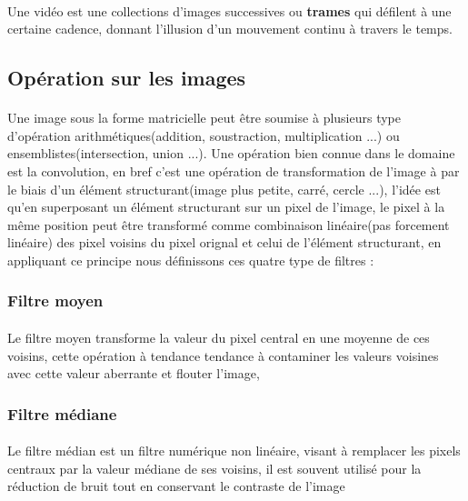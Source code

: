 \documentclass[12pt]{report}
\begin{document}
		\paragraph{}
		Une vidéo est une collections d'images successives ou \textbf{trames} qui défilent à
		une certaine cadence, donnant l'illusion d'un mouvement continu à travers le temps.
		
		\subsection{Opération sur les images}
		\paragraph{}
		Une image sous la forme matricielle peut être soumise à plusieurs type d'opération arithmétiques(addition,
		soustraction, multiplication ...) ou ensemblistes(intersection, union ...). Une opération bien
		connue dans le domaine est la convolution, en bref c'est une opération de transformation de l'image
		à par le biais d'un élément structurant(image plus petite, carré, cercle ...), l'idée est qu'en 
		superposant un élément structurant sur un pixel de l'image, le pixel à la même position peut être 
		transformé comme combinaison linéaire(pas forcement linéaire) des pixel voisins du pixel orignal et
		celui de l'élément structurant, en appliquant ce principe nous définissons ces quatre type de filtres :
		
			\subsubsection{Filtre moyen}
			\paragraph{}
			Le filtre moyen transforme la valeur du pixel central en une moyenne de ces voisins, cette opération 
			à tendance tendance à contaminer les valeurs voisines avec cette valeur aberrante et flouter l'image,
			
			\subsubsection{Filtre médiane}
			\paragraph{}
			Le filtre médian est un filtre numérique non linéaire, visant à remplacer les pixels centraux par 
			la valeur médiane de ses voisins, il est souvent utilisé pour la réduction de bruit tout en conservant
			le contraste de l'image
			
\end{document}
